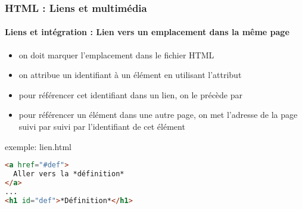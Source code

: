 \documentclass[xcolor=table]{beamer}
\begin{document}
\begin{frame}[fragile]
\frametitle{HTML : Liens et multimédia}
\framesubtitle{Liens et intégration : Lien vers un emplacement dans la même page}

\begin{minipage}{0.50\textwidth} 
	\begin{itemize}
		\item on doit marquer l'emplacement dans le fichier HTML
		\item on attribue un identifiant à un élément en utilisant l'attribut 
		\item pour référencer cet identifiant dans un lien, on le précède par \keyword{\#}
		\item pour référencer un élément dans une autre page, on met l'adresse de la page suivi par \keyword{\#} suivi par l'identifiant de cet élément
	\end{itemize}
\end{minipage}
%
\begin{minipage}{0.49\textwidth}
\begin{exampleblock}{exemple: lien.html}
\lstset{escapeinside=**}
\scriptsize\bfseries\vspace{-6pt}
\begin{lstlisting}[language={html}]
<a href="#def">
  Aller vers la *définition*
</a> 
...
<h1 id="def">*Définition*</h1>
\end{lstlisting}\vspace{-6pt}
\end{exampleblock}
\end{minipage}

\end{frame}
\end{document}
